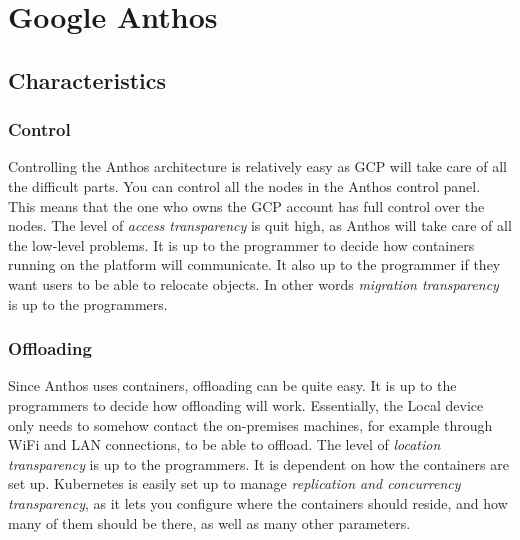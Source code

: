 















\section{Google Anthos}
\subsection{Characteristics}
\subsubsection{Control}
Controlling the Anthos architecture is relatively easy as GCP will take care of all the difficult parts. You can control all the nodes in the Anthos control panel. This means that the one who owns the GCP account has full control over the nodes. The level of \textit{access  transparency} is quit high, as Anthos will take care of all the low-level problems. It is up to the programmer to decide how containers running on the platform will communicate. It also up to the programmer if they want users to be able to relocate objects. In other words \textit{migration transparency} is up to the programmers.

\subsubsection{Offloading}
Since Anthos uses containers, offloading can be quite easy. It is up to the programmers to decide how offloading will work. Essentially, the Local device only needs to somehow contact the on-premises machines, for example through WiFi and LAN connections, to be able to offload. The level of \textit{location transparency} is up to the programmers. It is dependent on how the containers are set up. Kubernetes is easily set up to manage \textit{replication and concurrency transparency}, as it lets you configure where the containers should reside, and how many of them should be there, as well as many other parameters.

